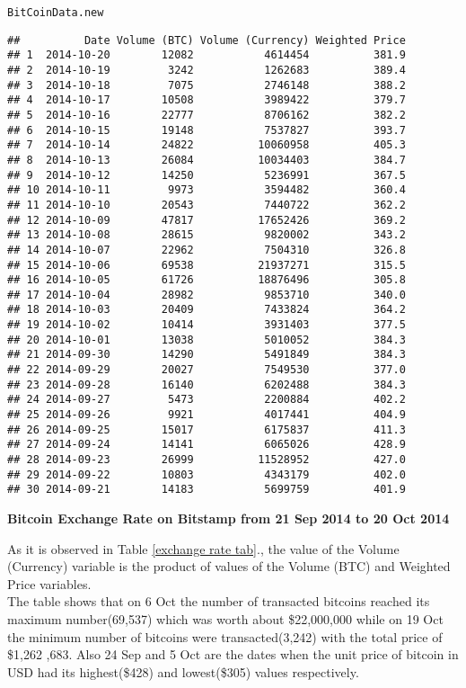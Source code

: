 \documentclass{article}\usepackage[]{graphicx}\usepackage[]{color}
\makeatletter
\newcommand{\hlstd}[1]{\textcolor[rgb]{0.345,0.345,0.345}{#1}}%
\newenvironment{kframe}{%
 \def\at@end@of@kframe{}%
 \ifinner\ifhmode%
  \def\at@end@of@kframe{\end{minipage}}%
  \begin{minipage}{\columnwidth}%
 \fi\fi%
 \def\FrameCommand##1{\hskip\@totalleftmargin \hskip-\fboxsep
 \colorbox{shadecolor}{##1}\hskip-\fboxsep
     \hskip-\linewidth \hskip-\@totalleftmargin \hskip\columnwidth}%
 \MakeFramed {\advance\hsize-\width
   \@totalleftmargin\z@ \linewidth\hsize
   \@setminipage}}%
 {\par\unskip\endMakeFramed%
 \at@end@of@kframe}
\newenvironment{knitrout}{}{} %
\makeatother
\begin{document}
\begin{knitrout}
\color{fgcolor}\begin{kframe}
\begin{alltt}
\hlstd{BitCoinData.new}
\end{alltt}
\begin{verbatim}
##          Date Volume (BTC) Volume (Currency) Weighted Price
## 1  2014-10-20        12082           4614454          381.9
## 2  2014-10-19         3242           1262683          389.4
## 3  2014-10-18         7075           2746148          388.2
## 4  2014-10-17        10508           3989422          379.7
## 5  2014-10-16        22777           8706162          382.2
## 6  2014-10-15        19148           7537827          393.7
## 7  2014-10-14        24822          10060958          405.3
## 8  2014-10-13        26084          10034403          384.7
## 9  2014-10-12        14250           5236991          367.5
## 10 2014-10-11         9973           3594482          360.4
## 11 2014-10-10        20543           7440722          362.2
## 12 2014-10-09        47817          17652426          369.2
## 13 2014-10-08        28615           9820002          343.2
## 14 2014-10-07        22962           7504310          326.8
## 15 2014-10-06        69538          21937271          315.5
## 16 2014-10-05        61726          18876496          305.8
## 17 2014-10-04        28982           9853710          340.0
## 18 2014-10-03        20409           7433824          364.2
## 19 2014-10-02        10414           3931403          377.5
## 20 2014-10-01        13038           5010052          384.3
## 21 2014-09-30        14290           5491849          384.3
## 22 2014-09-29        20027           7549530          377.0
## 23 2014-09-28        16140           6202488          384.3
## 24 2014-09-27         5473           2200884          402.2
## 25 2014-09-26         9921           4017441          404.9
## 26 2014-09-25        15017           6175837          411.3
## 27 2014-09-24        14141           6065026          428.9
## 28 2014-09-23        26999          11528952          427.0
## 29 2014-09-22        10803           4343179          402.0
## 30 2014-09-21        14183           5699759          401.9
\end{verbatim}
\end{kframe}
\end{knitrout}
\begin{table}[htbp]
\caption{\textbf{Bitcoin Exchange Rate on Bitstamp from 21 Sep 2014 to 20 Oct 2014}}
\label{exchange rate tab}
\end{table}
As it is observed in Table \ref{exchange rate tab}., the value of the Volume 
(Currency) variable is the product of values of the Volume (BTC) and Weighted Price 
variables. \\ 
The table shows that on 6 Oct the number of transacted bitcoins reached its 
maximum number(69,537) which was worth about \$22,000,000 while on 19 Oct the 
minimum number of bitcoins were transacted(3,242) with the total price of \$1,262
,683. Also 24 Sep and 5 Oct are the dates when the unit price of bitcoin in 
USD had its highest(\$428) and lowest(\$305) values respectively. 
\end{document}
